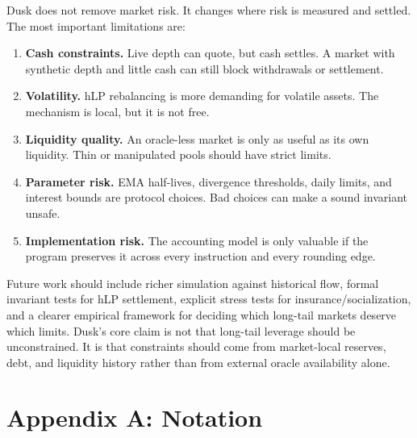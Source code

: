 \documentclass[11pt]{article}
\begin{document}
Dusk does not remove market risk. It changes where risk is measured and settled. The most important limitations are:
\begin{enumerate}
  \item \textbf{Cash constraints.} Live depth can quote, but cash settles. A market with synthetic depth and little cash can still block withdrawals or settlement.
  \item \textbf{Volatility.} hLP rebalancing is more demanding for volatile assets. The mechanism is local, but it is not free.
  \item \textbf{Liquidity quality.} An oracle-less market is only as useful as its own liquidity. Thin or manipulated pools should have strict limits.
  \item \textbf{Parameter risk.} EMA half-lives, divergence thresholds, daily limits, and interest bounds are protocol choices. Bad choices can make a sound invariant unsafe.
  \item \textbf{Implementation risk.} The accounting model is only valuable if the program preserves it across every instruction and every rounding edge.
\end{enumerate}

Future work should include richer simulation against historical flow, formal invariant tests for hLP settlement, explicit stress tests for insurance/socialization, and a clearer empirical framework for deciding which long-tail markets deserve which limits. Dusk's core claim is not that long-tail leverage should be unconstrained. It is that constraints should come from market-local reserves, debt, and liquidity history rather than from external oracle availability alone.

\appendix

\section{Appendix A: Notation}
\end{document}
